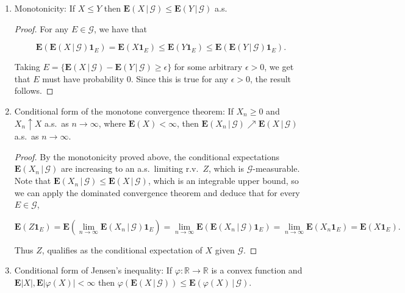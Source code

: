 \documentclass[11pt]{report}
\newcommand{\R}{\mathbb{R}}
\theoremstyle{plain}
\theoremstyle{definition}
\begin{document}
\begin{enumerate}[label=\arabic*.]
\begin{proof}
so $Z$ satisfies the requirements that qualify it to be the conditional expectation of $aX+bY$.
\end{proof}
\item Monotonicity: If $X\le Y$ then $\mathbf{E}\left(X\,|\,\mathcal{G}\right)\le\mathbf{E}\left(Y\,|\,\mathcal{G}\right)$ a.s.

\begin{proof}
For any $E\in\mathcal{G}$, we have that

\[
\mathbf{E}(\mathbf{E}\left(X\,|\,\mathcal{G}\right)\mathbf{1}_E) = \mathbf{E}(X\mathbf{1}_E) \le
\mathbf{E}(Y\mathbf{1}_E) \le \mathbf{E}(\mathbf{E}\left(Y\,|\,\mathcal{G}\right)\mathbf{1}_E).
\]

Taking $E=\{\mathbf{E}\left(X\,|\,\mathcal{G}\right)-\mathbf{E}\left(Y\,|\,\mathcal{G}\right)\ge \epsilon\}$ for some arbitrary $\epsilon>0$, we get that $E$ must have probability $0$. Since this is true for any $\epsilon>0$, the result follows.
\end{proof}
\item Conditional form of the monotone convergence theorem: If $X_n\ge 0$ and $X_n \uparrow X$ a.s.\ as $n\to\infty$, where $\mathbf{E}(X)<\infty$, then $\mathbf{E}\left(X_n\,|\,\mathcal{G}\right)\nearrow \mathbf{E}\left(X\,|\,\mathcal{G}\right)$ a.s.\ as $n\to\infty$.

\begin{proof}
By the monotonicity proved above, the conditional expectations $\mathbf{E}\left(X_n\,|\,\mathcal{G}\right)$ are increasing to an a.s.\ limiting r.v.\ $Z$, which is $\mathcal{G}$-measurable. Note that $\mathbf{E}\left(X_n\,|\,\mathcal{G}\right)\le \mathbf{E}\left(X\,|\,\mathcal{G}\right)$, which is an integrable upper bound, so we can apply the dominated convergence theorem and deduce that for every $E\in \mathcal{G}$,

\[
\mathbf{E}(Z\mathbf{1}_E) = \mathbf{E}(\lim_{n\to\infty} \mathbf{E}\left(X_n\,|\,\mathcal{G}\right)\mathbf{1}_E)
= \lim_{n\to\infty} \mathbf{E}(\mathbf{E}\left(X_n\,|\,\mathcal{G}\right)\mathbf{1}_E) = \lim_{n\to\infty} \mathbf{E}(X_n\mathbf{1}_E)
= \mathbf{E}(X\mathbf{1}_E).
\]

Thus $Z$, qualifies as the conditional expectation of $X$ given $\mathcal{G}$.
\end{proof}
\item Conditional form of Jensen's inequality: If $\varphi:\R\to\R$ is a convex function and $\mathbf{E}|X|, \mathbf{E}|\varphi(X)|<\infty$ then $\varphi(\mathbf{E}\left(X\,|\,\mathcal{G}\right)) \le \mathbf{E}\left(\varphi(X)\,|\,\mathcal{G}\right).$


\end{enumerate}
\end{document}

